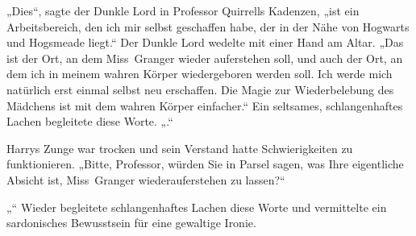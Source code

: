 „Dies“, sagte der Dunkle Lord in Professor Quirrells Kadenzen, „ist ein Arbeitsbereich, den ich mir selbst geschaffen habe, der in der Nähe von Hogwarts und Hogsmeade liegt.“
Der Dunkle Lord wedelte mit einer Hand am Altar.
„Das ist der Ort, an dem Miss~Granger wieder auferstehen soll, und auch der Ort, an dem ich in meinem wahren Körper wiedergeboren werden soll. Ich werde mich natürlich erst einmal selbst neu erschaffen. Die Magie zur Wiederbelebung des Mädchens ist mit dem wahren Körper einfacher.“
Ein seltsames, schlangenhaftes Lachen begleitete diese Worte.
„.“

Harrys Zunge war trocken und sein Verstand hatte Schwierigkeiten zu funktionieren.
„Bitte, Professor, würden Sie in Parsel sagen, was Ihre eigentliche Absicht ist, Miss~Granger wiederauferstehen zu lassen?“

„“
Wieder begleitete schlangenhaftes Lachen diese Worte und vermittelte ein sardonisches Bewusstsein für eine gewaltige Ironie.

